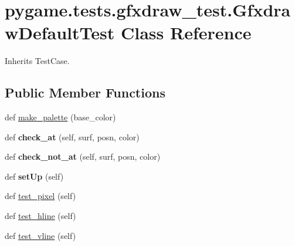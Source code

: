 \hypertarget{classpygame_1_1tests_1_1gfxdraw__test_1_1_gfxdraw_default_test}{}\section{pygame.\+tests.\+gfxdraw\+\_\+test.\+Gfxdraw\+Default\+Test Class Reference}
\label{classpygame_1_1tests_1_1gfxdraw__test_1_1_gfxdraw_default_test}


Inherits Test\+Case.

\subsection*{Public Member Functions}
\begin{DoxyCompactItemize}
\item 
def \hyperlink{classpygame_1_1tests_1_1gfxdraw__test_1_1_gfxdraw_default_test_a9b1f08c217638fff2b894c3def090bc4}{make\+\_\+palette} (base\+\_\+color)
\item 
\mbox{\label{classpygame_1_1tests_1_1gfxdraw__test_1_1_gfxdraw_default_test_a893bd3c06cc9a5c52b011d5e4deebe69}} 
def {\bfseries check\+\_\+at} (self, surf, posn, color)
\item 
\mbox{\label{classpygame_1_1tests_1_1gfxdraw__test_1_1_gfxdraw_default_test_a83344fde570427a877dcae70e3b1c36d}} 
def {\bfseries check\+\_\+not\+\_\+at} (self, surf, posn, color)
\item 
\mbox{\label{classpygame_1_1tests_1_1gfxdraw__test_1_1_gfxdraw_default_test_ad9daeb50bcf8b92c4b7a31c55c8d0d3e}} 
def {\bfseries set\+Up} (self)
\item 
def \hyperlink{classpygame_1_1tests_1_1gfxdraw__test_1_1_gfxdraw_default_test_ac7c007cb2981d1d9a503f18e59f95a66}{test\+\_\+pixel} (self)
\item 
def \hyperlink{classpygame_1_1tests_1_1gfxdraw__test_1_1_gfxdraw_default_test_a31f0748990af7c64a667a4bd7e1b38c2}{test\+\_\+hline} (self)
\item 
def \hyperlink{classpygame_1_1tests_1_1gfxdraw__test_1_1_gfxdraw_default_test_a7d231840bc4cb90729243b049a3c8b0d}{test\+\_\+vline} (self)

\end{DoxyCompactItemize}

